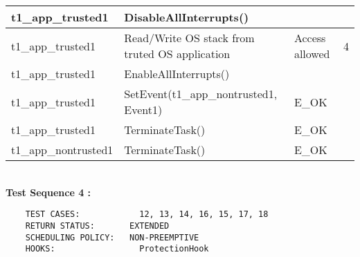 \documentclass[10pt]{article}
\newlength{\Li}\settowidth{\Li}{Running}
\newlength{\Lii}\setlength{\Lii}{7cm}
\newlength{\Liiii}\setlength{\Liiii}{0.9cm}
\newlength{\Liii}\setlength{\Liii}{\textwidth} \addtolength{\Liii}{-\Li} \addtolength{\Liii}{-\Lii} \addtolength{\Liii}{-\Liiii}
\begin{document}
\begin{supertabular}{|p{\Li}|p{\Lii}|p{\Liii}|p{\Liiii}|}
	t1\_app\_trusted1	& DisableAllInterrupts()								&												& \\ \hline
	t1\_app\_trusted1	& Read/Write OS stack from truted OS application			& Access allowed									& 4 \\ \hline
	t1\_app\_trusted1	& EnableAllInterrupts()								&												& \\ \hline

	t1\_app\_trusted1		& SetEvent(t1\_app\_nontrusted1, Event1)				& E\_OK											& \\ \hline
	t1\_app\_trusted1		& TerminateTask()									& E\_OK											& \\ \hline
	t1\_app\_nontrusted1	& TerminateTask()									& E\_OK											& \\ \hline
	\end{supertabular}\\

	\textbf{Test Sequence 4 :}
	\begin{lstlisting}
	TEST CASES:		       12, 13, 14, 16, 15, 17, 18
	RETURN STATUS:	  	 EXTENDED
	SCHEDULING POLICY:   NON-PREEMPTIVE
	HOOKS:		           ProtectionHook
	\end{lstlisting}
	
\end{document}
